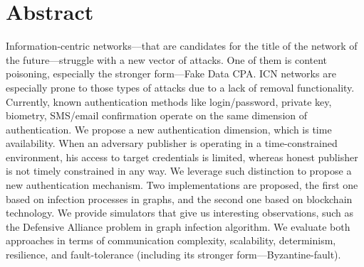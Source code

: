 \chapter*{Abstract}
Information-centric networks––that are candidates for the title of the network of the future––struggle with a new vector of attacks. One of them is content poisoning, especially the stronger form––Fake Data CPA. ICN networks are especially prone to those types of attacks due to a lack of removal functionality. Currently, known authentication methods like login/password, private key, biometry, SMS/email confirmation operate on the same dimension of authentication. We propose a new authentication dimension, which is time availability. When an adversary publisher is operating in a time-constrained environment, his access to target credentials is limited, whereas honest publisher is not timely constrained in any way. We leverage such distinction to propose a new authentication mechanism.
Two implementations are proposed, the first one based on infection processes in graphs, and the second one based on blockchain technology. We provide simulators that give us interesting observations, such as the Defensive Alliance problem in graph infection algorithm. We evaluate both approaches in terms of communication complexity, scalability, determinism, resilience, and fault-tolerance (including its stronger form––Byzantine-fault).
